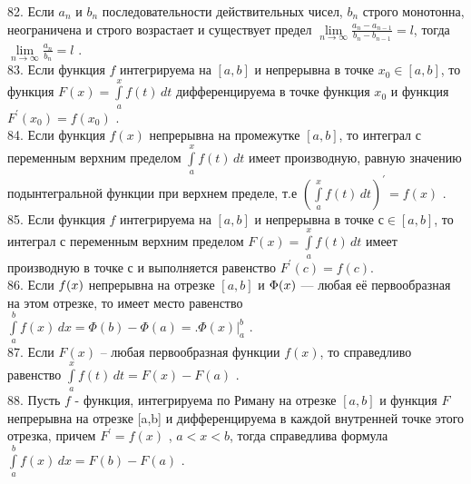 \documentclass[12pt]{article}
\begin{document}
{{{82. Если ${\displaystyle a_{n}}$ и ${\displaystyle b_{n}}$ последовательности действительных чисел, ${\displaystyle b_{n}}$ строго монотонна, неограничена и строго возрастает и существует предел ${\displaystyle \lim \limits _{n\to \infty }{\frac {a_{n}-a_{n-1}}{b_{n}-b_{n-1}}}=l}$, тогда ${\displaystyle \lim \limits _{n\to \infty } \frac {a_{n}}{b_{n}}=l}$ .\\

83. Если функция ${\displaystyle f}$ интегрируема на ${\displaystyle [a,b]}$ и непрерывна в точке ${\displaystyle x_0 \in [a,b]}$, то функция ${\displaystyle F(x)=\int \limits _{a}^{x} f(t)\,dt}$  дифференцируема в точке функция ${\displaystyle x_0}$ и функция ${\displaystyle F^{\prime}(x_0)=f(x_0)}$ .\\

84. Если функция ${\displaystyle f(x)}$ непрерывна на промежутке ${\displaystyle [a,b]}$, то интеграл с переменным верхним пределом  ${\displaystyle \int \limits _{a}^{x} f(t)\,dt}$ имеет производную, равную значению подынтегральной функции при верхнем пределе, т.е ${\displaystyle \left(\int \limits _{a}^{x} f(t)\,dt\right)^{\prime}=f(x)}$ .\\

85. Если функция ${\displaystyle f}$ интегрируема на ${\displaystyle [a,b]}$ и непрерывна в точке ${\displaystyle с \in [a,b]}$, то интеграл с переменным верхним пределом ${\displaystyle F(x)=\int \limits _{a}^{x} f(t)\, dt}$ имеет производную в точке ${\displaystyle с}$ и выполняется равенство ${\displaystyle F^{\prime}(c)=f(c)}$.\\

86. Если ${\displaystyle \textstyle f(x)}$ непрерывна на отрезке ${\displaystyle \left[a,b\right]}$  и ${\displaystyle \textstyle \Phi (x)}$ — любая её первообразная на этом отрезке, то имеет место равенство ${\displaystyle \int \limits _a^b f(x)\,dx=\Phi (b)-\Phi (a)={\Bigg .}\Phi (x){\Bigg |}_{a}^{b}}$ .\\

87. Если  ${\displaystyle F (x)}$ – любая первообразная функции ${\displaystyle f (x)}$,  то справедливо равенство ${\displaystyle \int \limits _a^x f(t)\,dt=F(x)-F(a)}$ .\\

88. Пусть ${\displaystyle f}$ - функция, интегрируема по Риману на отрезке ${\displaystyle [a,b]}$ и функция ${\displaystyle F}$ непрерывна на отрезке [a,b] и дифференцируема в каждой внутренней точке этого отрезка, причем ${\displaystyle F^{\prime}=f(x)}$ , ${\displaystyle a<x<b}$, тогда справедлива формула ${\displaystyle \int \limits _{a}^{b} f(x) \, dx=F(b)-F(a)}$ .\\

}}}
\end{document}
